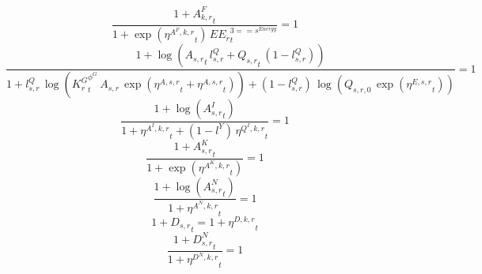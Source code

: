 \noindent[name= `sector TFP final demand 3 1']
\begin{dmath}
\frac{1+{{A^{F}_{k,r}}}_{t}}{1+\exp\left({{\eta^{A^F,k,r}}}_{t}\right)\, {{EE_r}}_{t}^{3=={{s^{Energy}}}}}=1
\end{dmath}
\noindent[name= `sector TFP 4 1']
\begin{dmath}
\frac{1+\log\left({{A_{s,r}}}_{t}\, {{l^{Q}_{s,r}}}+{{Q_{s,r}}}_{t}\, \left(1-{{l^{Q}_{s,r}}}\right)\right)}{1+{{l^{Q}_{s,r}}}\, \log\left({{K^G_{r}}}_{t}^{{{\phi^{G}}}}\, {{A_{s,r}}}\, \exp\left({{\eta^{A,s,r}}}_{t}+{{\eta^{A,s,r}}}_{t}\right)\right)+\left(1-{{l^{Q}_{s,r}}}\right)\, \log\left({{Q_{s,r,0}}}\, \exp\left({{\eta^{E,s,r}}}_{t}\right)\right)}=1
\end{dmath}
\noindent[name= `intermediate input productivity 4 1']
\begin{dmath}
\frac{1+\log\left({{A^{I}_{s,r}}}_{t}\right)}{1+{{\eta^{A^{I},k,r}}}_{t}+\left(1-{{l^{Y}}}\right)\, {{\eta^{Q^{I},k,r}}}_{t}}=1
\end{dmath}
\noindent[name= `capital productivity shock 4 1']
\begin{dmath}
\frac{1+{{A^{K}_{s,r}}}_{t}}{1+\exp\left({{\eta^{A^{K},k,r}}}_{t}\right)}=1
\end{dmath}
\noindent[name= `labour productivity shock 4 1']
\begin{dmath}
\frac{1+\log\left({{A^{N}_{s,r}}}_{t}\right)}{1+{{\eta^{A^{N},k,r}}}_{t}}=1
\end{dmath}
\noindent[name= `TFP damage 4 1']
\begin{dmath}
1+{{D_{s,r}}}_{t}=1+{{\eta^{D,k,r}}}_{t}
\end{dmath}
\noindent[name= `labour damage 4 1']
\begin{dmath}
\frac{1+{{D^N_{s,r}}}_{t}}{1+{{\eta^{D^{N},k,r}}}_{t}}=1
\end{dmath}
\noindent[name= `capital damage 4 1']
